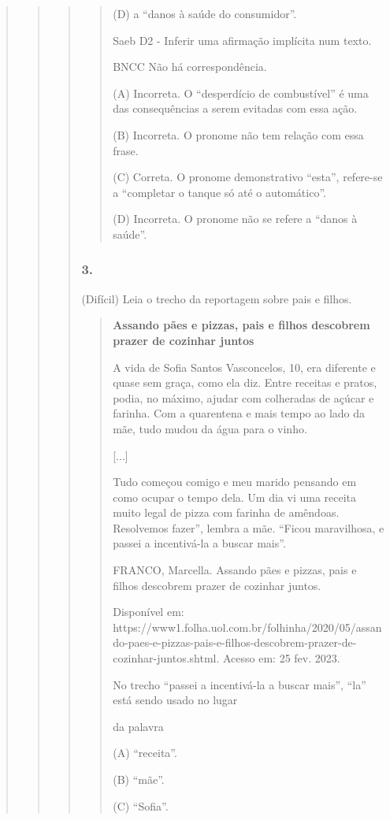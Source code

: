 \begin{quote}
\begin{quote}
\begin{quote}
\begin{quote}
(D) a ``danos à saúde do consumidor''.

Saeb D2 - Inferir uma afirmação implícita num texto.

BNCC Não há correspondência.

(A) Incorreta. O ``desperdício de combustível'' é uma das consequências
a serem evitadas com essa ação.

(B) Incorreta. O pronome não tem relação com essa frase.

(C) Correta. O pronome demonstrativo ``esta'', refere-se a ``completar o
tanque só até o automático''.

(D) Incorreta. O pronome não se refere a ``danos à saúde''.
\end{quote}

\subsubsection{3. }\label{section-79}

(Difícil) Leia o trecho da reportagem sobre pais e filhos.

\begin{quote}
\textbf{Assando pães e pizzas, pais e filhos descobrem prazer de
cozinhar juntos}

A vida de Sofia Santos Vasconcelos, 10, era diferente e quase sem graça,
como ela diz. Entre receitas e pratos, podia, no máximo, ajudar com
colheradas de açúcar e farinha. Com a quarentena e mais tempo ao lado da
mãe, tudo mudou da água para o vinho.

{[}...{]}

Tudo começou comigo e meu marido pensando em como ocupar o tempo dela.
Um dia vi uma receita muito legal de pizza com farinha de amêndoas.
Resolvemos fazer'', lembra a mãe. ``Ficou maravilhosa, e passei a
incentivá-la a buscar mais''.

FRANCO, Marcella. Assando pães e pizzas, pais e filhos descobrem prazer
de cozinhar juntos.

Disponível em:
https://www1.folha.uol.com.br/folhinha/2020/05/assando-paes-e-pizzas-pais-e-filhos-descobrem-prazer-de-cozinhar-juntos.shtml.
Acesso em: 25 fev. 2023.

No trecho ``passei a incentivá-la a buscar mais'', ``la'' está sendo
usado no lugar

da palavra

(A) ``receita''.

(B) ``mãe''.

(C) ``Sofia''.


\end{quote}
\end{quote}
\end{quote}
\end{quote}
